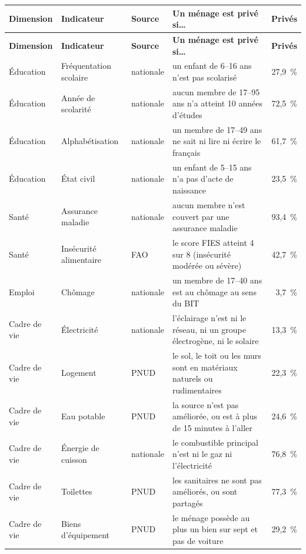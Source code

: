 \documentclass[11pt,a4paper]{article}
\begin{document}
\begin{center}
\small
\begin{longtable}{@{}>{\RaggedRight}p{2.1cm}>{\RaggedRight}p{2.5cm}l>{\RaggedRight}p{5.4cm}r@{}}
\toprule
\textbf{Dimension} & \textbf{Indicateur} & \textbf{Source} & \textbf{Un ménage est privé si\ldots} &
\textbf{Privés} \\
\midrule
\endfirsthead
\toprule
\textbf{Dimension} & \textbf{Indicateur} & \textbf{Source} & \textbf{Un ménage est privé si\ldots} &
\textbf{Privés} \\
\midrule
\endhead
Éducation & Fréquentation scolaire & nationale & un enfant de 6--16 ans n'est pas scolarisé
& 27,9~\% \\
Éducation & Année de scolarité & nationale & aucun membre de 17--95 ans n'a atteint 10 années
d'études & 72,5~\% \\
Éducation & Alphabétisation & nationale & un membre de 17--49 ans ne sait ni lire ni écrire le
français & 61,7~\% \\
Éducation & État civil & nationale & un enfant de 5--15 ans n'a pas d'acte de naissance
& 23,5~\% \\
\midrule
Santé & Assurance maladie & nationale & aucun membre n'est couvert par une assurance maladie
& 93,4~\% \\
Santé & Insécurité alimentaire & FAO & le score FIES atteint 4 sur 8 (insécurité modérée ou
sévère) & 42,7~\% \\
\midrule
Emploi & Chômage & nationale & un membre de 17--40 ans est au chômage au sens du BIT & 3,7~\% \\
\midrule
Cadre de vie & Électricité & nationale & l'éclairage n'est ni le réseau, ni un groupe
électrogène, ni le solaire & 13,3~\% \\
Cadre de vie & Logement & PNUD & le sol, le toit ou les murs sont en matériaux naturels ou
rudimentaires & 22,3~\% \\
Cadre de vie & Eau potable & PNUD & la source n'est pas améliorée, ou est à plus de 15 minutes
à l'aller & 24,6~\% \\
Cadre de vie & Énergie de cuisson & nationale & le combustible principal n'est ni le gaz ni
l'électricité & 76,8~\% \\
Cadre de vie & Toilettes & PNUD & les sanitaires ne sont pas améliorés, ou sont partagés
& 77,3~\% \\
Cadre de vie & Biens d'équipement & PNUD & le ménage possède au plus un bien sur sept et pas de
voiture & 29,2~\% \\
\bottomrule
\end{longtable}
\end{center}
\end{document}
